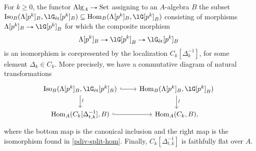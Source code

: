 \begin{lemma}
  \label{pdiv-split-iso}
  For $k \ge 0$, the functor $\Alg_A \to \Set$ assigning to an
  $A$-algebra $B$ the subset
  $\Iso_B(\Lambda[p^k]_B, \lG_\et[p^k]_B) \subseteq
  \Hom_B(\Lambda[p^k]_B, \lG[p^k]_B)$
  consisting of morphisms $\Lambda[p^k]_B \to \lG[p^k]_B$ for which
  the composite morphism
  \[
  \Lambda[p^k]_B \to \lG[p^k]_B \to \lG_\et[p^k]_B
  \]
  is an isomorphism is corepresented by the localization
  $C_k[\Delta_k^{-1}]$, for some element $\Delta_k \in C_k$. More
  precisely, we have a commutative diagram of natural transformations
  \begin{equation}
    \label{pdiv-split-iso-dgm}
    \begin{tikzcd}
      \Iso_B(\Lambda[p^k]_B, \lG_\et[p^k]_B) \ar[r, hook]
      \ar[d, "\sim"{rotate=90, yshift=-4pt, xshift=-4pt}] &
      \Hom_B(\Lambda[p^k]_B, \lG[p^k]_B)
      \ar[d, "\sim"{rotate=90, yshift=-4pt, xshift=-4pt}] \\
      \Hom_A(C_k[\Delta^{-1}_{t,k}],B) \ar[r, hook] &
      \Hom_A(C_k,B),
    \end{tikzcd}
  \end{equation}
  where the bottom map is the canonical inclusion and the right map is
  the isomorphism found in \cref{pdiv-split-hom}. Finally,
  $C_k[\Delta^{-1}_{t,k}]$ is faithfully flat over $A$.
\end{lemma}

